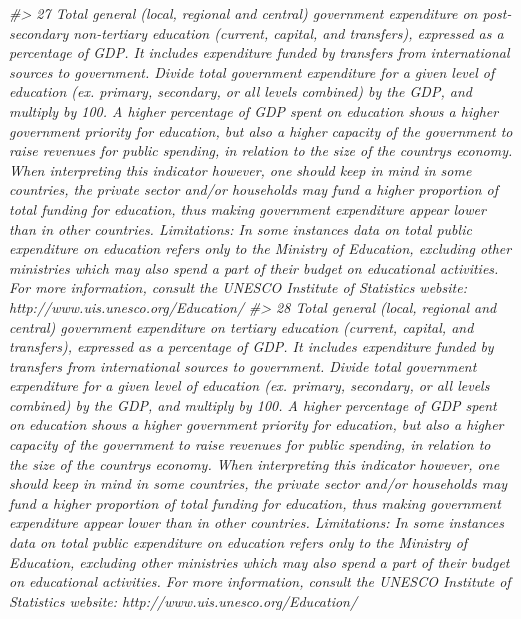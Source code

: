 \documentclass[
  xelatex, ja=standard]{bxjsbook}
\newenvironment{Shaded}{\begin{snugshade}}{\end{snugshade}}
\newcommand{\CommentTok}[1]{\textcolor[rgb]{0.56,0.35,0.01}{\textit{#1}}}
\theoremstyle{definition}
\theoremstyle{definition}
\theoremstyle{definition}
\theoremstyle{definition}
\theoremstyle{remark}
\begin{document}
\begin{Shaded}
\begin{Highlighting}[]
\CommentTok{\#\textgreater{} 27                                                                                                                                                                         Total general (local, regional and central) government expenditure on post{-}secondary non{-}tertiary education (current, capital, and transfers), expressed as a percentage of GDP. It includes expenditure funded by transfers from international sources to government. Divide total government expenditure for a given level of education (ex. primary, secondary, or all levels combined) by the GDP, and multiply by 100. A higher percentage of GDP spent on education shows a higher government priority for education, but also a higher capacity of the government to raise revenues for public spending, in relation to the size of the country\textquotesingle{}s economy. When interpreting this indicator however, one should keep in mind in some countries, the private sector and/or households may fund a higher proportion of total funding for education, thus making government expenditure appear lower than in other countries. Limitations: In some instances data on total public expenditure on education refers only to the Ministry of Education, excluding other ministries which may also spend a part of their budget on educational activities. For more information, consult the UNESCO Institute of Statistics website: http://www.uis.unesco.org/Education/}
\CommentTok{\#\textgreater{} 28                                                                                                                                                                                            Total general (local, regional and central) government expenditure on tertiary education (current, capital, and transfers), expressed as a percentage of GDP. It includes expenditure funded by transfers from international sources to government. Divide total government expenditure for a given level of education (ex. primary, secondary, or all levels combined) by the GDP, and multiply by 100. A higher percentage of GDP spent on education shows a higher government priority for education, but also a higher capacity of the government to raise revenues for public spending, in relation to the size of the country\textquotesingle{}s economy. When interpreting this indicator however, one should keep in mind in some countries, the private sector and/or households may fund a higher proportion of total funding for education, thus making government expenditure appear lower than in other countries. Limitations: In some instances data on total public expenditure on education refers only to the Ministry of Education, excluding other ministries which may also spend a part of their budget on educational activities. For more information, consult the UNESCO Institute of Statistics website: http://www.uis.unesco.org/Education/}

\end{Highlighting}
\end{Shaded}
\end{document}
